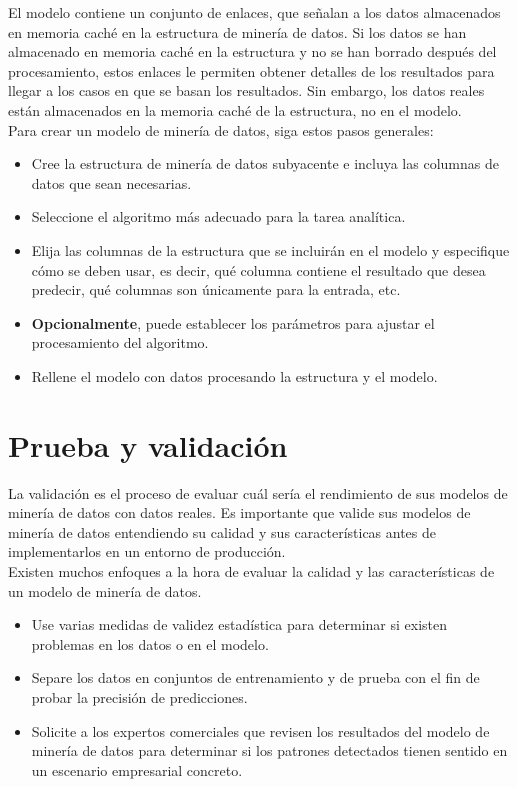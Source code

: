 \documentclass[a4paper, 11pt]{article} %
\begin{document}
El modelo contiene un conjunto de enlaces, que señalan a los datos almacenados en memoria caché en la estructura de minería de datos. Si los datos se han almacenado en memoria caché en la estructura y no se han borrado después del procesamiento, estos enlaces le permiten obtener detalles de los resultados para llegar a los casos en que se basan los resultados. Sin embargo, los datos reales están almacenados en la memoria caché de la estructura, no en el modelo.\\

Para crear un modelo de minería de datos, siga estos pasos generales:

\begin{itemize}
\item Cree la estructura de minería de datos subyacente e incluya las columnas de datos que sean necesarias.
\item Seleccione el algoritmo más adecuado para la tarea analítica.
\item Elija las columnas de la estructura que se incluirán en el modelo y especifique cómo se deben usar, es decir, qué columna contiene el resultado que desea predecir, qué columnas son únicamente para la entrada, etc.
\item \textbf{Opcionalmente}, puede establecer los parámetros para ajustar el procesamiento del algoritmo.
\item Rellene el modelo con datos procesando la estructura y el modelo.
\end{itemize}

\section*{Prueba y validación}

La validación es el proceso de evaluar cuál sería el rendimiento de sus modelos de minería de datos con datos reales. Es importante que valide sus modelos de minería de datos entendiendo su calidad y sus características antes de implementarlos en un entorno de producción.\\

Existen muchos enfoques a la hora de evaluar la calidad y las características de un modelo de minería de datos.

\begin{itemize}
\item Use varias medidas de validez estadística para determinar si existen problemas en los datos o en el modelo.
\item Separe los datos en conjuntos de entrenamiento y de prueba con el fin de probar la precisión de predicciones.
\item Solicite a los expertos comerciales que revisen los resultados del modelo de minería de datos para determinar si los patrones detectados tienen sentido en un escenario empresarial concreto.
\end{itemize}
\end{document}
